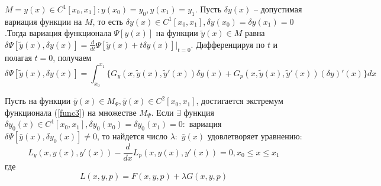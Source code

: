 $M = {y(x) \in C^1[x_0, x_1] : y(x_0) = y_0, y(x_1) = y_1}$.
Пусть $\delta y(x)$ – допустимая вариация функции на $M$, то есть $\delta y(x) \in C^1[x_0, x_1], \delta y(x_0) = \delta y(x_1) = 0$.Тогда вариация функционала $\Psi [y(x)]$ на функции $\widetilde y(x)\in M$ равна $\delta \Psi[\widetilde y(x), \delta y(x)]=\frac{d}{dt}\Psi[\widetilde y(x) + t\delta y(x)]\Big|_{t=0}$. Дифференцируя по $t$ и полагая $t = 0$, получаем 
$$\delta\Psi[\widetilde y(x), \delta y(x)]= \int_{x_0}^{x_1}\Big\{G_y(x, \widetilde y(x), \widetilde y'(x))\delta y(x) + G_p(x, \widetilde y(x), \widetilde y'(x))(\delta y)'(x) \Big\}dx$$
\begin{theorem}
    Пусть на функции $\bar y(x) \in M_\Psi, \bar y(x) \in C^2[x_0, x_1]$,
    достигается экстремум функционала (\ref{func3}) на множестве $M_\Psi$. Если
    $\exists$ функция $\delta y_0(x) \in C^1[x_0, x_1], \delta y_0(x_0) = \delta y_0(x_1) = 0:$ вариация $\delta\Psi[\bar y(x), \delta y_0(x)] \neq 0$, то найдется число $\lambda:$ $\bar y(x)$ удовлетворяет уравнению:
    \begin{equation}
        L_y(x, y(x), y'(x))-\frac{d}{dx}L_p(x, y(x), y'(x))=0, x_0 \leq x \leq x_1
        \label{kak_ze_i_zaebalsya}
    \end{equation}
    где 
    \begin{equation}
        L(x, y, p) = F(x, y, p) + \lambda G(x, y, p)
        \label{wtf}
    \end{equation}

\end{theorem}
